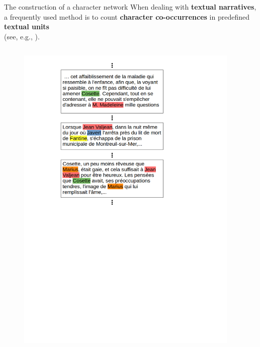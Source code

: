 \documentclass[10pt]{beamer}
\newcommand{\imp}[1]{\textbf{\color{cyan}#1}}
\begin{document}
	\begin{frame}{The construction of a character network}
		When dealing with \imp{textual narratives}, a frequently used method is to count \imp{character co-occurrences} in predefined \imp{textual units} \\(see, e.g., \cite{elsner_character-based_2012, rochat_analyse_2014}). \\
		\vspace{-0.4cm}
		\begin{columns}
			\begin{column}{0.5\textwidth}
				\begin{figure}
					\centering
					\includegraphics[width=1.4\textwidth]{img/textual_units.png}
				\end{figure}
			\end{column}
			\begin{column}{0.5\textwidth}
				\vspace{-4cm}

\end{column}
\end{columns}
\end{frame}
\end{document}
